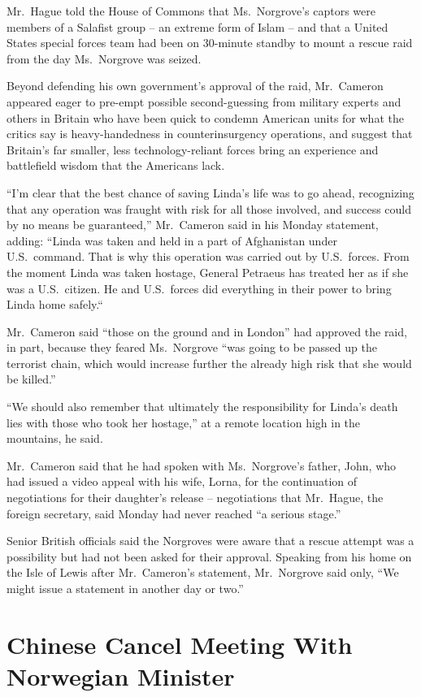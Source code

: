﻿\documentclass[12pt]{article}
\begin{document}
Mr.~Hague told the House of Commons that Ms.~Norgrove's captors were members of a Salafist group --
an extreme form of Islam -- and that a United States special forces team had been on 30-minute
standby to mount a rescue raid from the day Ms.~Norgrove was seized.

Beyond defending his own government's approval of the raid, Mr.~Cameron appeared eager to pre-empt
possible second-guessing from military experts and others in Britain who have been quick to condemn
American units for what the critics say is heavy-handedness in counterinsurgency operations, and
suggest that Britain's far smaller, less technology-reliant forces bring an experience and
battlefield wisdom that the Americans lack.

``I'm clear that the best chance of saving Linda's life was to go ahead, recognizing that any
operation was fraught with risk for all those involved, and success could by no means be
guaranteed,'' Mr.~Cameron said in his Monday statement, adding: ``Linda was taken and held in a part
of Afghanistan under U.S.~command. That is why this operation was carried out by U.S.~forces. From
the moment Linda was taken hostage, General Petraeus has treated her as if she was a U.S.~citizen.
He and U.S.~forces did everything in their power to bring Linda home safely.``

Mr.~Cameron said ``those on the ground and in London'' had approved the raid, in part, because they
feared Ms.~Norgrove ``was going to be passed up the terrorist chain, which would increase further
the already high risk that she would be killed.''

``We should also remember that ultimately the responsibility for Linda's death lies with those who
took her hostage,'' at a remote location high in the mountains, he said.

Mr.~Cameron said that he had spoken with Ms.~Norgrove's father, John, who had issued a video appeal
with his wife, Lorna, for the continuation of negotiations for their daughter's release --
negotiations that Mr.~Hague, the foreign secretary, said Monday had never reached ``a serious
stage.''

Senior British officials said the Norgroves were aware that a rescue attempt was a possibility but
had not been asked for their approval. Speaking from his home on the Isle of Lewis after
Mr.~Cameron's statement, Mr.~Norgrove said only, ``We might issue a statement in another day or
two.''

\section{Chinese Cancel Meeting With Norwegian Minister}
\end{document}
